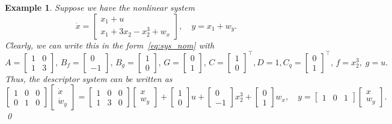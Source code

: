\documentclass[times, doublespace]{rncauth}
\newtheorem{example}{Example}
\begin{document}
\begin{example}
Suppose we have the nonlinear system
\[
\dot x = \begin{bmatrix}
x_1 + u\\
x_1 + 3x_2 - x_2^3 + w_x
\end{bmatrix}, \quad y = x_1 + w_y.
\]
Clearly, we can write this in the form~\eqref{eq:sys_nom} with
\[
A = \begin{bmatrix}
1 & 0 \\ 1 & 3
\end{bmatrix}, \, B_f = \begin{bmatrix}
0 \\ -1
\end{bmatrix}, \, B_g = \begin{bmatrix}
1 \\ 0
\end{bmatrix}, \, G = \begin{bmatrix}
0 \\ 1
\end{bmatrix}, \, C = \begin{bmatrix}
1 \\ 0
\end{bmatrix}^\top, D = 1, C_q = \begin{bmatrix}
0 \\ 1
\end{bmatrix}^\top, \, f = x_2^3, \; g =  u.
\]
Thus, the descriptor system can be written as
\[
\begin{bmatrix}
1 & 0 & 0\\
0 & 1 & 0
\end{bmatrix} \begin{bmatrix}
\dot x \\ \dot w_y
\end{bmatrix} = \begin{bmatrix}
1 & 0 & 0\\ 1 & 3 & 0
\end{bmatrix}\begin{bmatrix}
x \\ w_y
\end{bmatrix} + \begin{bmatrix}
1 \\ 0
\end{bmatrix} u + \begin{bmatrix}
0 \\ -1
\end{bmatrix}x_2^3 + \begin{bmatrix}
0\\ 1
\end{bmatrix}w_x, \quad y = \begin{bmatrix}
1 & 0 & 1
\end{bmatrix}\begin{bmatrix}
x \\ w_y
\end{bmatrix}.
\]\qed
\end{example}
\end{document}
